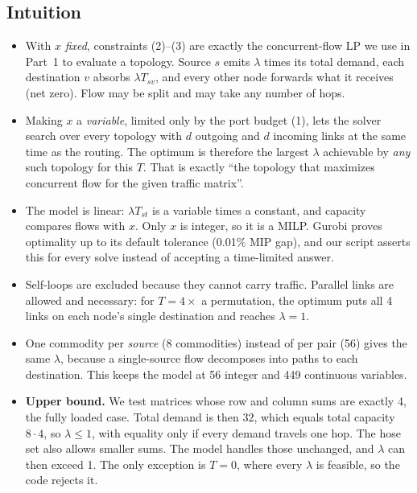 \documentclass[11pt,letterpaper]{article}
\begin{document}
\subsection{Intuition}
\begin{itemize}
\item With $x$ \emph{fixed}, constraints (2)--(3) are exactly the concurrent-flow
LP we use in Part~1 to evaluate a topology. Source $s$ emits $\lambda$ times its
total demand, each destination $v$ absorbs $\lambda T_{sv}$, and every other node
forwards what it receives (net zero). Flow may be split and may take any number
of hops.
\item Making $x$ a \emph{variable}, limited only by the port budget (1), lets the
solver search over every topology with $d$ outgoing and $d$ incoming links at
the same time as the routing. The optimum is therefore the largest $\lambda$
achievable by \emph{any} such topology for this $T$. That is exactly ``the topology
that maximizes concurrent flow for the given traffic matrix''.
\item The model is linear: $\lambda T_{st}$ is a variable times a constant, and
capacity compares flows with $x$. Only $x$ is integer, so it is a MILP. Gurobi
proves optimality up to its default tolerance (0.01\% MIP gap), and our script
asserts this for every solve instead of accepting a time-limited answer.
\item Self-loops are excluded because they cannot carry traffic. Parallel links
are allowed and necessary: for $T=4\times$ a permutation, the optimum puts all 4
links on each node's single destination and reaches $\lambda=1$.
\item One commodity per \emph{source} (8 commodities) instead of per pair (56)
gives the same $\lambda$, because a single-source flow decomposes into paths to
each destination. This keeps the model at 56 integer and 449 continuous variables.
\item \textbf{Upper bound.} We test matrices whose row and column sums are
exactly 4, the fully loaded case. Total demand is then $32$, which equals total
capacity $8\cdot4$, so $\lambda\le1$, with equality only if every demand travels
one hop. The hose set also allows smaller sums. The model handles those unchanged,
and $\lambda$ can then exceed 1. The only exception is $T=0$, where every $\lambda$
is feasible, so the code rejects it.
\end{itemize}
\end{document}
